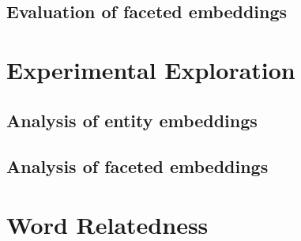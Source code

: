 \subsection{Evaluation of faceted embeddings}\label{subsec:eval_faceted}

\section{Experimental Exploration}\label{sec:eval_experimental}
\subsection{Analysis of entity embeddings}\label{subsec:exp_entity}
\subsection{Analysis of faceted embeddings}\label{subsec:exp_faceted}

\section{Word Relatedness}\label{sec:relatedness}


